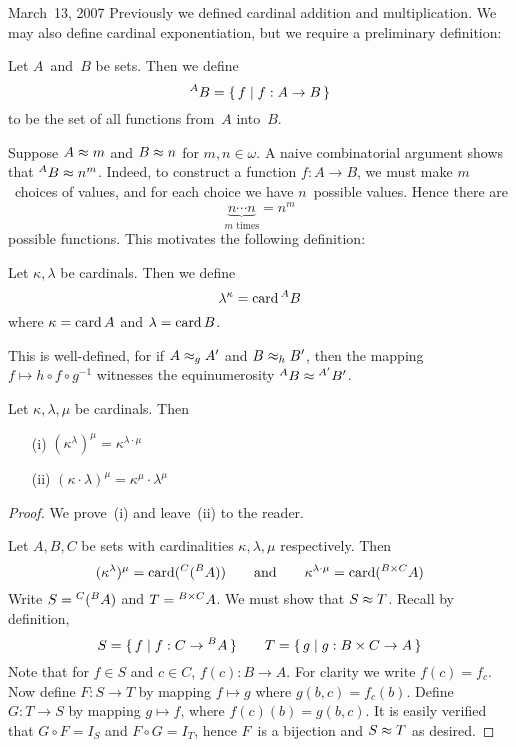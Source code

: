 \begin{lecture}{March~13, 2007}
Previously we defined cardinal addition and multiplication. We may also define cardinal exponentiation, but we require a preliminary definition:
\begin{defn}
Let \(A\)~and~\(B\) be sets. Then we define
\[{}^{A}{B}=\{\,f\mid f:A\to B\,\}\]
to be the set of all functions from~\(A\) into~\(B\).
\end{defn}
\noindent Suppose \(A\approx m\) and \(B\approx n\) for \(m,n\in\omega\). A naive combinatorial argument shows that \({}^{A}{B}\approx n^m\). Indeed, to construct a function \(f:A\to B\), we must make \(m\)~choices of values, and for each choice we have \(n\)~possible values. Hence there are
\[\underbrace{n\cdots n}_{m\text{ times}}=n^m\]
possible functions. This motivates the following definition:
\begin{defn}
Let \(\kappa,\lambda\) be cardinals. Then we define
\[\lambda^{\kappa}=\operatorname{card}{{}^{A}{B}}\]
where \(\kappa=\operatorname{card} A\) and \(\lambda=\operatorname{card} B\).
\end{defn}
\noindent This is well-defined, for if \(A\approx_g A'\) and \(B\approx_h B'\), then the mapping \(f\mapsto h\circ f\circ g^{-1}\) witnesses the equinumerosity \({}^{A}{B}\approx{}^{A'}{B'}\).
\begin{prop}
Let \(\kappa,\lambda,\mu\) be cardinals. Then
\begin{enumerate}[itemsep=0pt]
\item[(i)] \((\kappa^{\lambda})^{\mu}=\kappa^{\lambda\cdot\mu}\)
\item[(ii)] \((\kappa\cdot\lambda)^{\mu}=\kappa^{\mu}\cdot\lambda^{\mu}\)
\end{enumerate}
\end{prop}
\begin{proof}
We prove~(i) and leave~(ii) to the reader.

Let \(A,B,C\) be sets with cardinalities \(\kappa,\lambda,\mu\) respectively. Then
\[(\kappa^{\lambda})^{\mu}=\operatorname{card}({}^{C}{({}^{B}{A})})\qquad\text{and}\qquad \kappa^{\lambda\cdot\mu}=\operatorname{card}({}^{B\times C}{A})\]
Write \(S={}^{C}{({}^{B}{A})}\) and \(T={}^{B\times C}{A}\). We must show that \(S\approx T\). Recall by definition,
\[S=\{\,f\mid f:C\to {}^{B}{A}\,\}\qquad T=\{\,g\mid g:B\times C\to A\,\}\]
Note that for \(f\in S\) and \(c\in C\), \(f(c):B\to A\). For clarity we write \(f(c)=f_c\). Now define \(F:S\to T\) by mapping \(f\mapsto g\) where \(g(b,c)=f_c(b)\). Define \(G:T\to S\) by mapping \(g\mapsto f\), where \(f(c)(b)=g(b,c)\). It is easily verified that \(G\circ F=I_S\) and \(F\circ G=I_T\), hence \(F\)~is a bijection and \(S\approx T\) as desired.
\end{proof}


\end{lecture}
